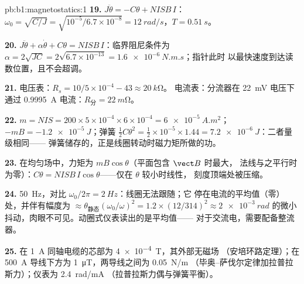 \begin{solution}{pb:b1:magnetostatics:1}
\textbf{19.} $J\ddot\theta = -C\theta + NISB\,I$：$\omega_0 = \sqrt{C/J} = \sqrt{10^{-5}/6.7
\times 10^{-8}} = \qty{12}{rad/s}$，$T = \qty{0.51}{s}$。

\textbf{20.} $J\ddot\theta + \alpha\dot\theta + C\theta = NISB\,I$：临界阻尼条件为
$\alpha = 2\sqrt{JC} = 2\sqrt{6.7 \times 10^{-13}} = \qty{1.6e-6}{N.m.s}$；指针此时
以最快速度到达读数位置，且不会超调。

\textbf{21.} 电压表：$R_s = 10/5 \times 10^{-4} - 43 \approx \qty{20}{k\ohm}$。
电流表：分流器在 \qty{22}{mV} 电压下通过 \qty{0.9995}{A} 电流：$R_{\text{分}} =
\qty{22}{m\ohm}$。

\textbf{22.} $m = NIS = 200 \times 5 \times 10^{-4} \times 6 \times 10^{-4} = \qty{6e-5}{A.m^2}$；
$-mB = \qty{-1.2e-5}{J}$；弹簧 $\tfrac12C\theta^2 = \tfrac12 \times 10^{-5} \times 1.44 =
\qty{7.2e-6}{J}$：二者量级相同——
弹簧储存的，正是线圈转动时磁力矩所做的功。

\textbf{23.} 在均匀场中，力矩为 $mB\cos\theta$（平面包含 $\vect B$ 时最大，
法线与之平行时为零）：$C\theta =
NISB\,I\cos\theta$——仅在 $\theta$ 较小时线性，
刻度顶端处被压缩。

\textbf{24.} \qty{50}{Hz}，对比 $\omega_0/2\pi = \qty{2}{Hz}$：线圈无法跟随；它
停在电流的平均值（零）处，并伴有幅度为
$\approx \theta_{\text{静态}}(\omega_0/\omega)^2 = 1.2 \times (12/314)^2 \approx
\qty{2e-3}{rad}$ 的微小抖动，肉眼不可见。动圈式仪表读出的是平均值——
对于交流电，需要配备整流器。

\textbf{25.} 在 \qty{1}{A} 同轴电缆的芯部为 \qty{4e-4}{T}，其外部无磁场
（安培环路定理）；在 \qty{500}{A} 导线下方为 \qty{1}{\micro T}，两导线之间为 \qty{0.05}{N/m}
（毕奥–萨伐尔定律加拉普拉斯力）；仪表为 \qty{2.4}{rad/mA}
（拉普拉斯力偶与弹簧平衡）。
\end{solution}
